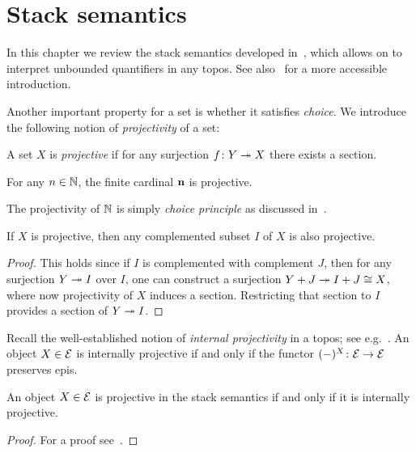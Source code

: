 \chapter{Stack semantics}\label{ch:stacksemantics}

In this chapter we review the stack semantics developed in~\citet{shulman2010stack}, which allows on to interpret unbounded quantifiers in any topos. See also~\citet[\S I.2]{blechschmidt:2017} for a more accessible introduction.

Another important property for a set is whether it satisfies \emph{choice}. We introduce the following notion of \emph{projectivity} of a set:

\begin{definition}[Projectivity]
  A set $X$ is \emph{projective} if for any surjection $f \colon Y \twoheadrightarrow X$ there exists a section.
\end{definition}

\begin{example}\label{exa:finiteprojective}
  For any $n\in\mathbb{N}$, the finite cardinal $\mathbf{n}$ is projective.
\end{example}

\begin{example}\label{exa:countablechoice}
  The projectivity of $\mathbb{N}$ is simply \emph{choice principle} as discussed in~.
\end{example}

\begin{lemma}\label{lem:projdecsubset}
  If $X$ is projective, then any complemented subset $I$ of $X$ is also projective.
\end{lemma}
\begin{proof}
  This holds since if $I$ is complemented with complement $J$, then for any surjection $Y \twoheadrightarrow I$ over $I$, one can construct a surjection $Y + J \twoheadrightarrow I + J \cong X$, where now projectivity of $X$ induces a section. Restricting that section to $I$ provides a section of $Y \twoheadrightarrow I$. 
\end{proof}

Recall the well-established notion of \emph{internal projectivity} in a topos; see e.g.~\citet[Exer. IV.16]{maclane1992sheaves}. An object $X\in\mathcal{E}$ is internally projective if and only if the functor $(-)^X \colon \mathcal{E} \to \mathcal{E}$ preserves epis.

\begin{proposition}\label{prop:projectiveintopos}
  An object $X\in\mathcal{E}$ is projective in the stack semantics if and only if it is internally projective.
\end{proposition}
\begin{proof}
  For a proof see~\citet[Thm. 3.3]{nlab:internally_projective_object}.
\end{proof}

